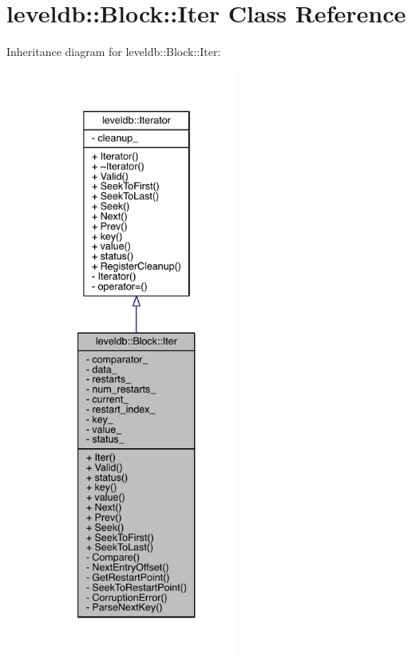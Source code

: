 \hypertarget{classleveldb_1_1_block_1_1_iter}{}\section{leveldb\+:\+:Block\+:\+:Iter Class Reference}
\label{classleveldb_1_1_block_1_1_iter}


Inheritance diagram for leveldb\+:\+:Block\+:\+:Iter\+:\nopagebreak
\begin{figure}[H]
\begin{center}
\leavevmode
\includegraphics[height=550pt]{classleveldb_1_1_block_1_1_iter__inherit__graph}
\end{center}
\end{figure}


